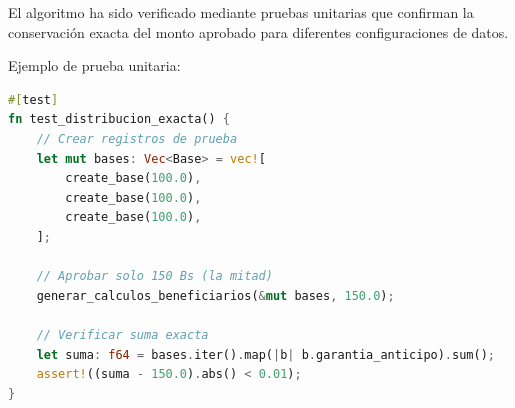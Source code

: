El algoritmo ha sido verificado mediante pruebas unitarias que confirman la conservación exacta del monto aprobado para diferentes configuraciones de datos.

\bigskip

Ejemplo de prueba unitaria:
\begin{lstlisting}[language=rust]
#[test]
fn test_distribucion_exacta() {
    // Crear registros de prueba
    let mut bases: Vec<Base> = vec![
        create_base(100.0),
        create_base(100.0),
        create_base(100.0),
    ];
    
    // Aprobar solo 150 Bs (la mitad)
    generar_calculos_beneficiarios(&mut bases, 150.0);
    
    // Verificar suma exacta
    let suma: f64 = bases.iter().map(|b| b.garantia_anticipo).sum();
    assert!((suma - 150.0).abs() < 0.01);
}
\end{lstlisting}

\vfill
\newpage
